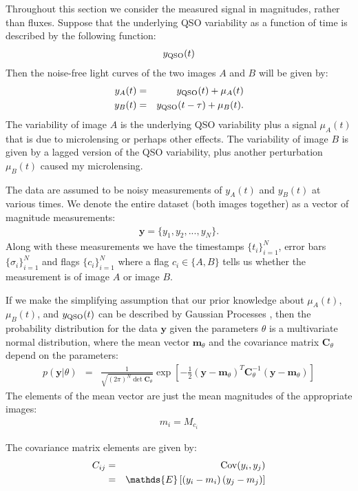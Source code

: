 \documentclass[a4paper, 10pt]{article}
\title{}
\author{}
\date{} %
\newcommand{\yy}{\mathbf{y}}
\newcommand{\mm}{\mathbf{m}_\theta}
\newcommand{\CC}{\mathbf{C}_\theta}
\begin{document}
Throughout this section we consider the measured signal in magnitudes,
rather than fluxes. Suppose that the underlying QSO variability as a function
of time is described by the following function:
\begin{eqnarray}
y_{\rm QSO}(t)
\end{eqnarray}
Then the noise-free light curves of the two images
$A$ and $B$ will be given by:
\begin{eqnarray}
y_A(t) &=& y_{\rm QSO}(t) + \mu_A(t)\\
y_B(t) &=& y_{\rm QSO}(t - \tau) + \mu_B(t).
\end{eqnarray}
The variability of image $A$ is the underlying QSO variability
plus a signal $\mu_A(t)$ that is due to microlensing or perhaps
other effects. The variability of image $B$ is given by
a lagged version of the QSO variability, plus another
perturbation $\mu_B(t)$ caused my microlensing.

The data are assumed to be noisy measurements of $y_A(t)$ and
$y_B(t)$ at various times. We denote the entire dataset (both images together)
as a vector of magnitude measurements:
\begin{eqnarray}
\yy = \{y_1, y_2, ..., y_N\}.
\end{eqnarray}
Along with these measurements we have the timestamps $\{t_i\}_{i=1}^N$,
error bars $\{\sigma_i\}_{i=1}^N$ and flags
$\{c_i\}_{i=1}^N$ where a flag $c_i \in \{A, B\}$ tells us whether the
measurement is of image $A$ or image $B$.

If we make the simplifying assumption that our prior knowledge about
$\mu_A(t)$, $\mu_B(t)$, and
$y_{\rm QSO}(t)$ can be described by Gaussian Processes \citep{rasmussen},
then the probability distribution for the data $\yy$ given the parameters
$\theta$
is a multivariate normal distribution, where the mean vector $\mm$
and the covariance matrix $\CC$ depend on the parameters:
\begin{eqnarray}
p(\yy | \theta) &=& \frac{1}{\sqrt{(2\pi)^N\det{\CC}}}
\exp\left[
-\frac{1}{2}
\left(
\yy - \mm
\right)^T
\CC^{-1}
\left(
\yy - \mm
\right)
\right]
\end{eqnarray}
The elements of the mean vector are just the mean magnitudes of the
appropriate images:
\begin{eqnarray}
m_i = M_{c_i}
\end{eqnarray}

The covariance matrix elements are given by:
\begin{eqnarray}
C_{ij} &=& \textnormal{Cov}(y_i, y_j) \\
&=& \mathds{E}\left[
\left(y_i - m_i\right)
\left(y_j - m_j\right)
\right]
\end{eqnarray}
\end{document}
